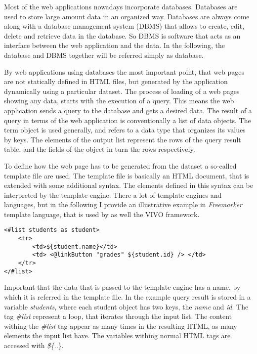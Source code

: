 Most of the web applications nowadays incorporate databases. Databases are used to store large amount data in an organized way. Databases are always come along with a database management system (DBMS) that allows to create, edit, delete and retrieve data in the database. So DBMS is software that acts as an interface between the web application and the data. In the following, the database and DBMS together will be referred simply as database.  

By web applications using databases the most important point, that web pages are not statically defined in HTML files, but generated by the application dynamically using a particular dataset. The process of loading of a web pages showing any data, starts with the execution of a query. This means the web application sends a query to the database and gets a desired data. The result of a query in terms of the web application is conventionally a list of data objects. The term object is used generally, and refers to a data type that organizes its values by keys. The elements of the output list represent the rows of the query result table, and the fields of the object in turn the rows respectively. 

To define how the web page has to be generated from the dataset a so-called template file are used. The template file is basically an HTML document, that is extended with some additional syntax. The elements defined in this syntax can be interpreted by the template engine. There a lot of template engines and languages, but in the following I provide an illustrative example in \textit{Freemarker} template language, that is used by as well the VIVO framework.

\begin{lstlisting}[captionpos=b, caption=Template file example, label=skullJSON, belowskip=1em, aboveskip=2em,
basicstyle=\footnotesize,frame=single]
<#list students as student>
	<tr>
		<td>${student.name}</td>
		<td> <@linkButton "grades" ${student.id} /> </td>
	</tr>
</#list>
\end{lstlisting}

Important that the data that is passed to the template engine has a name, by which it is referred in the template file. In the example query result is stored in a variable \textit{students}, where each student object has two keys, the \textit{name} and \textit{id}. The tag \textit{\#list} represent a loop, that iterates through the input list. The content withing the \textit{\#list} tag appear as many times in the resulting HTML, as many elements the input list have. The variables withing normal HTML tags are accessed with \textit{\$\{..}\}. 

